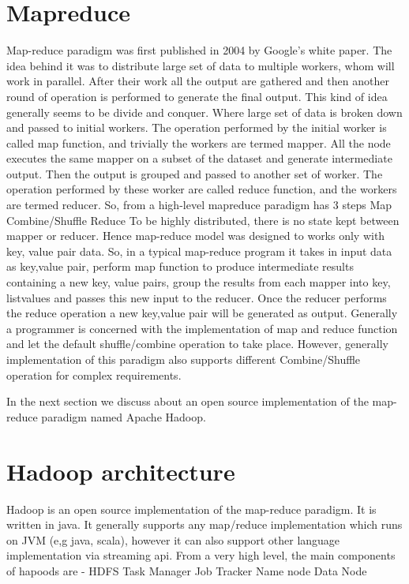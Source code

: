 \documentclass{article}
\begin{document}
\section{Mapreduce}
Map-reduce paradigm was first published in 2004 by Google’s white paper. The idea behind it was to distribute large set of data to multiple workers, whom will work in parallel. After their work all the output are gathered and then another round of operation is performed to generate the final output. This kind of idea generally seems to be divide and conquer. Where large set of data is broken down and passed to initial workers. The operation performed by the initial worker is called map function, and trivially the workers are termed mapper. All the node executes the same mapper on a subset of the dataset and generate intermediate output. Then the output is grouped and passed to another set of worker. The operation performed by these worker are called reduce function, and the workers are termed reducer. So, from a high-level mapreduce paradigm has 3 steps
Map
Combine/Shuffle
Reduce
To be highly distributed, there is no state kept between mapper or reducer. Hence map-reduce model was designed to works only with {key, value} pair data. So, in a typical map-reduce program it takes in input data as {key,value} pair, perform map function to produce intermediate results containing a new {key, value} pairs, group the results from each mapper into {key, list{values}} and passes this new input to the reducer. Once the reducer performs the reduce operation a new {key,value} pair will be generated as output. Generally a programmer is concerned with the implementation of map and reduce function and let the default shuffle/combine operation to take place. However, generally implementation of this paradigm also supports different Combine/Shuffle operation for complex requirements.

In the next section we discuss about an open source implementation of the map-reduce paradigm named Apache Hadoop.


\section{Hadoop architecture}
Hadoop is an open source implementation of the map-reduce paradigm. It is written in java. It generally supports any map/reduce implementation which runs on JVM (e,g java, scala), however it can also support other language implementation via streaming api. From a very high level, the main components of hapoods are -
HDFS
Task Manager
Job Tracker
Name node
Data Node
\end{document}

